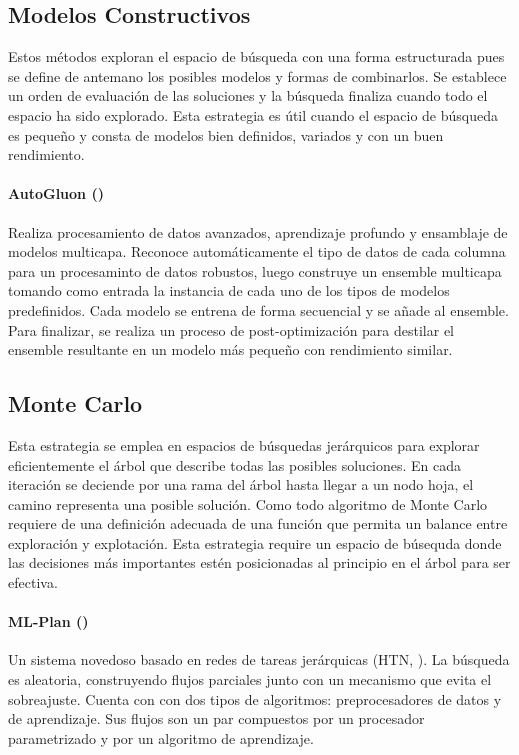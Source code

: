 
\subsection{Modelos Constructivos}
Estos m\'etodos exploran el espacio de b\'usqueda con una forma estructurada pues se define de antemano los posibles modelos y formas de combinarlos. Se establece un orden de evaluaci\'on de las soluciones y la b\'usqueda finaliza cuando todo el espacio ha sido explorado. Esta estrategia es \'util cuando el espacio de b\'usqueda es peque\~no y consta de modelos bien definidos, variados y con un buen rendimiento.

\paragraph{AutoGluon (\cite{erickson2020autogluon})} Realiza procesamiento de datos avanzados, aprendizaje profundo y ensamblaje de modelos multicapa. Reconoce autom\'aticamente el tipo de datos de cada columna para un procesaminto de datos robustos, luego construye un ensemble multicapa  tomando como entrada la instancia de cada uno de los tipos de modelos predefinidos. Cada modelo se entrena de forma secuencial y se a\~nade al ensemble. Para finalizar, se realiza un proceso de post-optimizaci\'on para destilar el ensemble resultante en un modelo m\'as peque\~no con rendimiento similar.

\subsection{Monte Carlo}
 Esta estrategia se emplea en espacios de b\'usquedas jer\'arquicos para explorar eficientemente el \'arbol que describe todas las  posibles soluciones. En cada iteraci\'on se deciende por una rama del \'arbol hasta llegar a un nodo hoja, el camino representa una posible soluci\'on. Como todo algoritmo de Monte Carlo requiere de una definici\'on adecuada de una funci\'on que permita un balance entre exploraci\'on y explotaci\'on. Esta estrategia require un espacio de b\'usequda donde las decisiones m\'as importantes est\'en posicionadas al principio en el \'arbol para ser efectiva.

 \paragraph{ML-Plan (\cite{mohr2018ml})} Un sistema novedoso basado en redes de tareas jer\'arquicas (HTN, \cite{erol1994umcp}). La b\'usqueda es aleatoria, construyendo flujos parciales junto con un mecanismo que evita el sobreajuste. Cuenta con con dos tipos de algoritmos:  preprocesadores de datos y de aprendizaje. Sus flujos son un par compuestos por un procesador parametrizado y por un algoritmo de aprendizaje.
    


